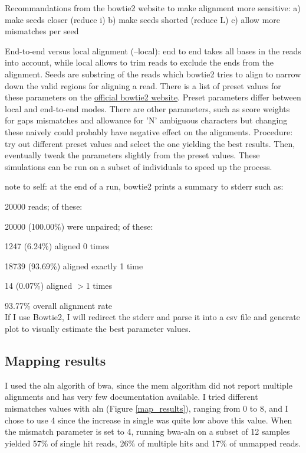 \documentclass[10pt,a4paper]{report}
\begin{document}
Recommandations from the bowtie2 website to make alignment more sensitive: 
a) make seeds closer (reduce i)
b) make seeds shorted (reduce L)
c) allow more mismatches per seed

End-to-end versus local alignment (--local): end to end takes all bases in the reads into account, while local allows to trim reads to exclude the ends from the alignment.
Seeds are substring of the reads which bowtie2 tries to align to narrow down the valid regions for aligning a read. There is a list of preset values for these parameters on the \href{http://bowtie-bio.sourceforge.net/bowtie2/manual.shtml#preset-options-in---end-to-end-mode}{official bowtie2 website}. Preset parameters differ between local and end-to-end modes.
There are other parameters, such as score weights for gaps mismatches and allowance for 'N' ambiguous characters but changing these naively could probably have negative effect on the alignments.
Procedure: try out different preset values and select the one yielding the best results. Then, eventually tweak the parameters slightly from the preset values. These simulations can be run on a subset of individuals to speed up the process.

note to self: at the end of a run, bowtie2 prints a summary to stderr such as:

20000 reads; of these:

  20000 (100.00\%) were unpaired; of these:
  
    1247 (6.24\%) aligned 0 times
    
    18739 (93.69\%) aligned exactly 1 time
    
    14 (0.07\%) aligned $>$1 times
    
93.77\% overall alignment rate
\vspace{10px}\\
If I use Bowtie2, I will redirect the stderr and parse it into a csv file and generate plot to visually estimate the best parameter values.

\subsection{Mapping results}

I used the aln algorith of bwa, since the mem algorithm did not report multiple alignments and has very few documentation available. I tried different mismatches values with aln (Figure \ref{map_results}), ranging from 0 to 8, and I chose to use 4 since the increase in single was quite low above this value. When the mismatch parameter is set to 4, running bwa-aln on a subset of 12 samples yielded 57\% of single hit reads, 26\% of multiple hits and 17\% of unmapped reads.
\end{document}
